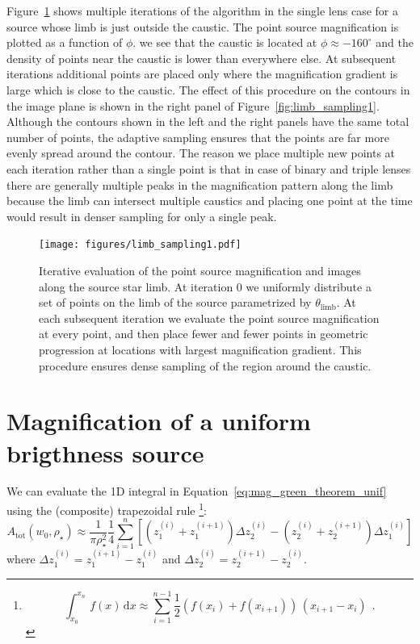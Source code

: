 \documentclass[12pt,dvipsnames]{report}
\newcommand{\ud}{\,\mathrm{d}}
\newcommand{\ssf}[1]{\textsf{#1}}
\newcommand{\hquad}{~~}
\begin{document}
Figure~\ref{fig:limb_sampling2} shows multiple iterations of the algorithm in the single
lens case for a source whose limb is just outside the caustic. The point source magnification
is plotted as a function of $\phi$. we see that the caustic is located at
$\phi\approx -160^\circ$ and the density of points near the caustic is lower than
everywhere else. At subsequent iterations additional points are placed only where
the magnification gradient is large which is close to the caustic. The effect of this
procedure on the contours in the image plane is shown in the right panel of
Figure~\ref{fig:limb_sampling1}. Although the contours shown in the left and the right
panels have the same total number of points, the adaptive sampling ensures that the
points are far more evenly spread around the contour. The reason we place multiple new
points at each iteration rather than a single point is that in case of binary
and triple lenses there are generally multiple peaks in the magnification pattern
along the limb  because the limb can intersect multiple caustics and placing one
point at the time would result in denser sampling for only a single peak.

\begin{figure}[t]
    \begin{centering}
        \texttt{[image: figures/limb\_sampling1.pdf]}
        \caption{Iterative evaluation of the point source magnification and images
            along the source star limb. At iteration 0 we
            uniformly distribute a set of points on the limb of the source
            parametrized by $\theta_\mathrm{limb}$. At each subsequent iteration
            we evaluate the point source magnification at every point, and then place
            fewer and fewer points in geometric progression at locations with largest
            magnification gradient. This procedure ensures dense sampling of the region
            around the caustic.}
        \label{fig:limb_sampling2}
    \end{centering}
\end{figure}

\section{Magnification of a uniform brigthness source}
We can evaluate the 1D integral in Equation~\ref{eq:mag_green_theorem_unif}
using the (composite) \ssf{trapezoidal rule} \footnote{\begin{equation}\int_{x_0}^{x_n}\,f(x)\ud x\approx \sum_{i=1}^{n-1} \frac{1}{2}(f(x_i) + f(x_{i+1}))\,(x_{i+1} - x_i)\hquad .\end{equation}}:
\begin{equation}
    A_\mathrm{tot}\left(w_0, \rho_{\star}\right)\approx  \frac{1}{ \pi \rho_{\star}^{2}}
    \frac{1}{4}\sum_{i=1}^{n}\left[\left(z_1^{(i)}+z_1^{(i+1)}\right)\Delta z_2^{(i)}
    -\left(z_2^{(i)}+z_2^{(i+1)}\right)\Delta z_1^{(i)}\right]
\end{equation}
where $\Delta z_1^{(i)}= z_1^{(i+1)}-z_1^{(i)}$ and $\Delta z_2^{(i)}= z_2^{(i+1)}-z_2^{(i)}$.
\end{document}
